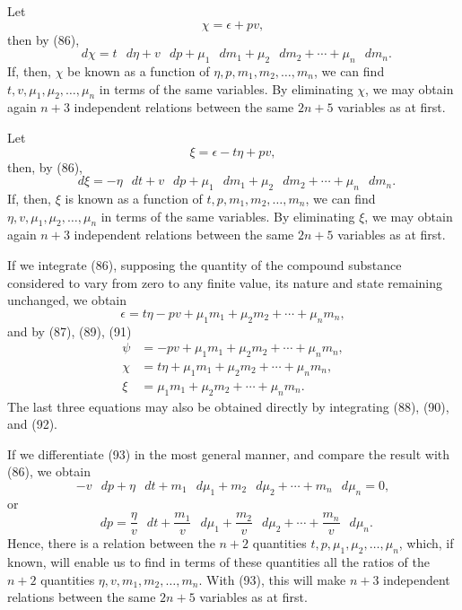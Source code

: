 \documentclass[11pt]{article}
\newcommand{\dd}{\mathop{}\!d}
\newcommand{\eps}{\epsilon}
\begin{document}
Let
\begin{equation}
\chi=\eps+pv,
\end{equation}
then by (86),
\begin{equation}
\dd\chi=t\,\dd\eta+v\,\dd p+\mu_1\,\dd m_1+\mu_2\,\dd m_2+\cdots+\mu_n\,\dd m_n.
\end{equation}
If, then, \(\chi\) be known as a function of \(\eta,p,m_1,m_2,\ldots,m_n\), we can find \(t,v,\mu_1,\mu_2,\ldots,\mu_n\) in terms of the same variables. By eliminating \(\chi\), we may obtain again \(n+3\) independent relations between the same \(2n+5\) variables as at first.

Let
\begin{equation}
\xi=\eps-t\eta+pv,
\end{equation}
then, by (86),
\begin{equation}
\dd\xi=-\eta\,\dd t+v\,\dd p+\mu_1\,\dd m_1+\mu_2\,\dd m_2+\cdots+\mu_n\,\dd m_n.
\end{equation}
If, then, \(\xi\) is known as a function of \(t,p,m_1,m_2,\ldots,m_n\), we can find \(\eta,v,\mu_1,\mu_2,
\ldots,\mu_n\) in terms of the same variables. By eliminating \(\xi\), we may obtain again \(n+3\) independent relations between the same \(2n+5\) variables as at first.

If we integrate (86), supposing the quantity of the compound substance considered to vary from zero to any finite value, its nature and state remaining unchanged, we obtain
\begin{equation}
\eps=t\eta-pv+\mu_1m_1+\mu_2m_2+\cdots+\mu_nm_n,
\end{equation}
and by (87), (89), (91)
\begin{align}
\psi&=-pv+\mu_1m_1+\mu_2m_2+\cdots+\mu_nm_n,\\
\chi&=t\eta+\mu_1m_1+\mu_2m_2+\cdots+\mu_nm_n,\\
\xi&=\mu_1m_1+\mu_2m_2+\cdots+\mu_nm_n.
\end{align}
The last three equations may also be obtained directly by integrating (88), (90), and (92).

If we differentiate (93) in the most general manner, and compare the result with (86), we obtain
\begin{equation}
-v\,\dd p+\eta\,\dd t+m_1\,\dd\mu_1+m_2\,\dd\mu_2+\cdots+m_n\,\dd\mu_n=0,
\end{equation}
or
\begin{equation}
\dd p=\frac{\eta}{v}\,\dd t+\frac{m_1}{v}\,\dd\mu_1+\frac{m_2}{v}\,\dd\mu_2+\cdots+\frac{m_n}{v}\,\dd\mu_n.
\end{equation}
Hence, there is a relation between the \(n+2\) quantities \(t,p,\mu_1,\mu_2,\ldots,\mu_n\), which, if known, will enable us to find in terms of these quantities all the ratios of the \(n+2\) quantities \(\eta,v,m_1,m_2,\ldots,m_n\). With (93), this will make \(n+3\) independent relations between the same \(2n+5\) variables as at first.
\end{document}
